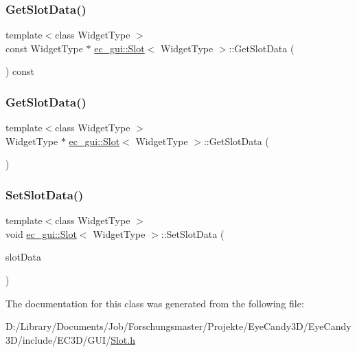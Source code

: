 \subsubsection{\texorpdfstring{Get\+Slot\+Data()}{GetSlotData()}\hspace{0.1cm}{\footnotesize\ttfamily [1/2]}}
{\footnotesize\ttfamily template$<$class Widget\+Type $>$ \\
const Widget\+Type $\ast$ \mbox{\hyperlink{classec__gui_1_1_slot}{ec\+\_\+gui\+::\+Slot}}$<$ Widget\+Type $>$\+::Get\+Slot\+Data (\begin{DoxyParamCaption}{ }\end{DoxyParamCaption}) const}

\mbox{\label{classec__gui_1_1_slot_a4f095102292e99216422f32248d9189f}} 
\subsubsection{\texorpdfstring{Get\+Slot\+Data()}{GetSlotData()}\hspace{0.1cm}{\footnotesize\ttfamily [2/2]}}
{\footnotesize\ttfamily template$<$class Widget\+Type $>$ \\
Widget\+Type $\ast$ \mbox{\hyperlink{classec__gui_1_1_slot}{ec\+\_\+gui\+::\+Slot}}$<$ Widget\+Type $>$\+::Get\+Slot\+Data (\begin{DoxyParamCaption}{ }\end{DoxyParamCaption})}

\mbox{\label{classec__gui_1_1_slot_a1c250069c2168720fdbf581e12643bc4}} 
\subsubsection{\texorpdfstring{Set\+Slot\+Data()}{SetSlotData()}}
{\footnotesize\ttfamily template$<$class Widget\+Type $>$ \\
void \mbox{\hyperlink{classec__gui_1_1_slot}{ec\+\_\+gui\+::\+Slot}}$<$ Widget\+Type $>$\+::Set\+Slot\+Data (\begin{DoxyParamCaption}\item[{Widget\+Type $\ast$}]{slot\+Data }\end{DoxyParamCaption})}



The documentation for this class was generated from the following file\+:\begin{DoxyCompactItemize}
\item 
D\+:/\+Library/\+Documents/\+Job/\+Forschungsmaster/\+Projekte/\+Eye\+Candy3\+D/\+Eye\+Candy3\+D/include/\+E\+C3\+D/\+G\+U\+I/\mbox{\hyperlink{_slot_8h}{Slot.\+h}}\end{DoxyCompactItemize}
